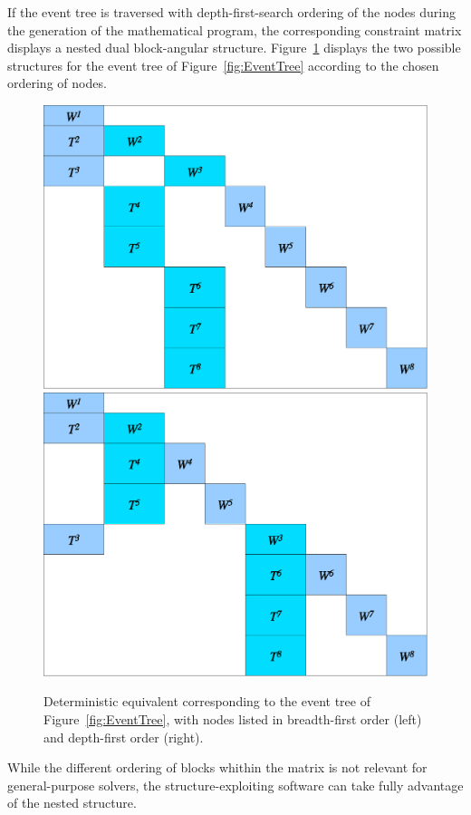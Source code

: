 If the event tree is traversed with depth-first-search ordering of the 
nodes during the generation of the mathematical program, the 
corresponding constraint matrix displays a nested dual block-angular 
structure.
Figure~\ref{fig:deteq} displays the two possible structures 
for the event tree of Figure~\ref{fig:EventTree} according 
to the chosen ordering of nodes.
%
\begin{figure}[ht]
  \centering
    \includegraphics[scale=0.37]{figures/deteq-bfs.eps} \hfill
    \includegraphics[scale=0.37]{figures/deteq-dfs.eps}
    \caption{Deterministic equivalent corresponding to the event tree 
             of Figure~\ref{fig:EventTree}, with nodes listed in breadth-first 
             order (left) and depth-first order (right).}
    \label{fig:deteq}
\end{figure}
%
While the different ordering of blocks whithin the matrix is not 
relevant for general-purpose solvers, the
structure-exploiting software \OOPS \cite{GondzioSarkissian} can take 
fully advantage of the nested structure.

